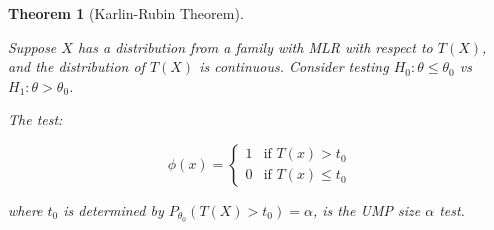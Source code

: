 \documentclass[
  letterpaper,
  DIV=11,
  numbers=noendperiod]{scrreprt}
\renewcommand{\[}{\begin{equation}}
\renewcommand{\]}{\end{equation}}
\theoremstyle{definition}
\theoremstyle{plain}
\theoremstyle{plain}
\theoremstyle{plain}
\newtheorem{theorem}{Theorem}[chapter]
\theoremstyle{definition}
\theoremstyle{plain}
\theoremstyle{remark}
\begin{document}
\begin{theorem}[Karlin-Rubin
Theorem]\protect\hypertarget{thm-karlin-rubin}{}\label{thm-karlin-rubin}

Suppose \(X\) has a distribution from a family with MLR with respect to
\(T(X)\), and the distribution of \(T(X)\) is continuous. Consider
testing \(H_0: \theta \le \theta_0\) vs \(H_1: \theta > \theta_0\).

The test:

\[
\phi(x) = \begin{cases} 
1 & \text{if } T(x) > t_0 \\
0 & \text{if } T(x) \le t_0
\end{cases}
\]

where \(t_0\) is determined by \(P_{\theta_0}(T(X) > t_0) = \alpha\), is
the UMP size \(\alpha\) test.

\end{theorem}
\end{document}
